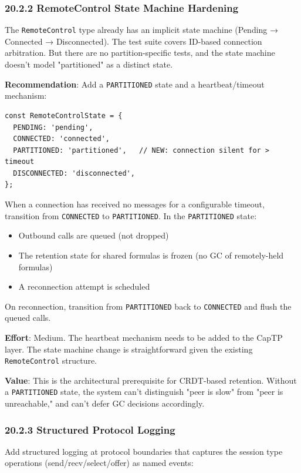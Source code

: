 \documentclass[11pt]{article}
\begin{document}
\subsubsection{20.2.2 RemoteControl State Machine Hardening}
\label{sec:orgaecb0c3}

The \texttt{RemoteControl} type already has an implicit state machine
(Pending → Connected → Disconnected). The test suite covers ID-based
connection arbitration. But there are no partition-specific tests, and
the state machine doesn't model "partitioned" as a distinct state.

\textbf{Recommendation}: Add a \texttt{PARTITIONED} state and a heartbeat/timeout
mechanism:

\begin{verbatim}
const RemoteControlState = {
  PENDING: 'pending',
  CONNECTED: 'connected',
  PARTITIONED: 'partitioned',   // NEW: connection silent for > timeout
  DISCONNECTED: 'disconnected',
};
\end{verbatim}

When a connection has received no messages for a configurable timeout,
transition from \texttt{CONNECTED} to \texttt{PARTITIONED}. In the \texttt{PARTITIONED} state:
\begin{itemize}
\item Outbound calls are queued (not dropped)
\item The retention state for shared formulas is frozen (no GC of remotely-held formulas)
\item A reconnection attempt is scheduled
\end{itemize}

On reconnection, transition from \texttt{PARTITIONED} back to \texttt{CONNECTED} and
flush the queued calls.

\textbf{Effort}: Medium. The heartbeat mechanism needs to be added to the CapTP
layer. The state machine change is straightforward given the existing
\texttt{RemoteControl} structure.

\textbf{Value}: This is the architectural prerequisite for CRDT-based retention.
Without a \texttt{PARTITIONED} state, the system can't distinguish "peer is slow"
from "peer is unreachable," and can't defer GC decisions accordingly.
\subsubsection{20.2.3 Structured Protocol Logging}
\label{sec:org653c5c4}

Add structured logging at protocol boundaries that captures the session
type operations (send/recv/select/offer) as named events:
\end{document}
